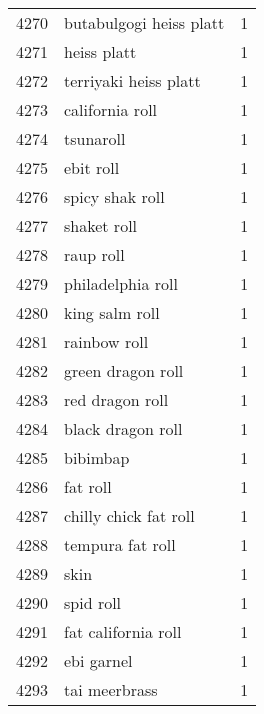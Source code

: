 \begin{tabular}{llr}
4270 &                            butabulgogi heiss platt &      1 \\
4271 &                                        heiss platt &      1 \\
4272 &                              terriyaki heiss platt &      1 \\
4273 &                                    california roll &      1 \\
4274 &                                          tsunaroll &      1 \\
4275 &                                          ebit roll &      1 \\
4276 &                                    spicy shak roll &      1 \\
4277 &                                        shaket roll &      1 \\
4278 &                                          raup roll &      1 \\
4279 &                                  philadelphia roll &      1 \\
4280 &                                     king salm roll &      1 \\
4281 &                                       rainbow roll &      1 \\
4282 &                                  green dragon roll &      1 \\
4283 &                                    red dragon roll &      1 \\
4284 &                                  black dragon roll &      1 \\
4285 &                                           bibimbap &      1 \\
4286 &                                           fat roll &      1 \\
4287 &                              chilly chick fat roll &      1 \\
4288 &                                   tempura fat roll &      1 \\
4289 &                                               skin &      1 \\
4290 &                                          spid roll &      1 \\
4291 &                                fat california roll &      1 \\
4292 &                                         ebi garnel &      1 \\
4293 &                                      tai meerbrass &      1 \\

\end{tabular}
